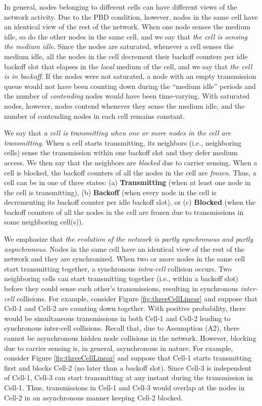 \documentclass[10pt,a4paper,journal]{IEEEtran}
\theoremstyle{definition}
\theoremstyle{remark}
\theoremstyle{plain}
\begin{document}
In general, nodes belonging to different cells can have different views of the network activity. Due to the PBD condition, however, nodes in the same cell have an identical view of the rest of the network. When one node senses the medium idle, so do the other nodes in the same cell, and we say that \textit{the cell is sensing the medium idle}. Since the nodes are saturated, whenever a cell senses the medium idle, all the nodes in the cell decrement their backoff counters per idle backoff slot that elapses in the \textit{local} medium of the cell, and we say that \textit{the cell is in backoff}. If the nodes were not saturated, a node with an empty transmission queue would not have been counting down during the ``medium idle'' periods and the number of \textit{contending} nodes would have been time-varying. With saturated nodes, however, nodes contend whenever they sense the medium idle, and the number of contending nodes in each cell remains constant. 

We say that \textit{a cell is transmitting when one or more nodes in the cell are transmitting}. When a cell starts transmitting, its neighbors (i.e., neighboring cells) sense the transmission within one backoff slot and they defer medium access. We then say that the neighbors are \textit{blocked} due to carrier sensing. When a cell is blocked, the backoff counters of all the nodes in the cell are \textit{frozen}. Thus, a cell can be in one of three states: (a) \textbf{Transmitting} (when at least one node in the cell is transmitting), (b) \textbf{Backoff} (when every node in the cell is decrementing its backoff counter per idle backoff slot), or (c) \textbf{Blocked} (when the backoff counters of all the nodes in the cell are frozen due to transmissions in some neighboring cell(s)).




We emphasize that \textit{the evolution of the network is partly synchronous and partly asynchronous}. Nodes in the same cell have an identical view of the rest of the network and they are synchronized. When two or more nodes in the same cell start transmitting together, a synchronous \textit{intra-cell} collision occurs. Two neighboring cells can start transmitting together (i.e., within a backoff slot) before they could sense each other's transmissions, resulting in synchronous \textit{inter-cell} collisions. For example, consider Figure \ref{fig:threeCellLinear} and suppose that Cell-1 and Cell-2 are counting down together. With positive probability, there would be simultaneous transmissions in both Cell-1 and Cell-2 leading to synchronous inter-cell collisions. Recall that, due to Assumption (A2), there cannot be asynchronous hidden node collisions in the network. However, blocking due to carrier sensing is, in general, asynchronous in nature. For example, consider Figure \ref{fig:threeCellLinear} and suppose that Cell-1 starts transmitting first and blocks Cell-2 (no later than a backoff slot). Since Cell-3 is independent of Cell-1, Cell-3 can start transmitting at any instant during the transmission in Cell-1. Thus, transmissions in Cell-1 and Cell-3 would overlap at the nodes in Cell-2 in an asynchronous manner keeping Cell-2 blocked. 
\end{document}
